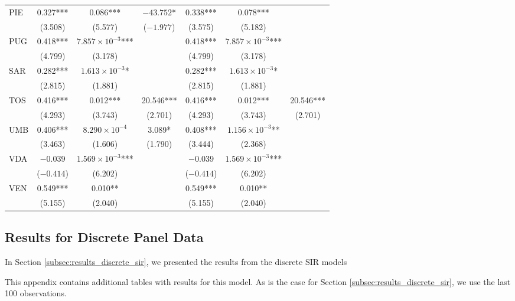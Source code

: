 \documentclass[12pt]{article}
\begin{document}
\begin{appendices}
\begin{longtable}{@{}lcccccc@{}}
            PIE & 0.327*** & 0.086*** & $-43.752$* & 0.338*** & 0.078*** &  \\ 
             & (3.508) & (5.577) & ($-1.977$) & (3.575) & (5.182) &  \\ 
            PUG & 0.418*** & $7.857 \times 10^{-3}$*** &  & 0.418*** & $7.857 \times 10^{-3}$*** &  \\ 
             & (4.799) & (3.178) &  & (4.799) & (3.178) &  \\ 
            SAR & 0.282*** & $1.613 \times 10^{-3}$* &  & 0.282*** & $1.613 \times 10^{-3}$* &  \\ 
             & (2.815) & (1.881) &  & (2.815) & (1.881) &  \\ 
            TOS & 0.416*** & 0.012*** & 20.546*** & 0.416*** & 0.012*** & 20.546*** \\ 
             & (4.293) & (3.743) & (2.701) & (4.293) & (3.743) & (2.701) \\ 
            UMB & 0.406*** & $8.290 \times 10^{-4}$ & 3.089* & 0.408*** & $1.156 \times 10^{-3}$** &  \\ 
             & (3.463) & (1.606) & (1.790) & (3.444) & (2.368) &  \\ 
            VDA & $-0.039$ & $1.569 \times 10^{-3}$*** &  & $-0.039$ & $1.569 \times 10^{-3}$*** &  \\
             & ($-0.414$) & (6.202) &  & ($-0.414$) & (6.202) &  \\ 
            VEN & 0.549*** & 0.010** &  & 0.549*** & 0.010** &  \\ 
             & (5.155) & (2.040) &  & (5.155) & (2.040) &  \\* \bottomrule
    	\end{longtable}
		
		\subsection{Results for Discrete Panel Data}\label{sapp:results_discrete_sir}
		In Section \ref{subsec:results_discrete_sir}, we presented the results from the discrete SIR models
        
        This appendix contains additional tables with results for this model. As is the case for Section \ref{subsec:results_discrete_sir}, we use the last 100 observations.
        

\end{appendices}
\end{document}
